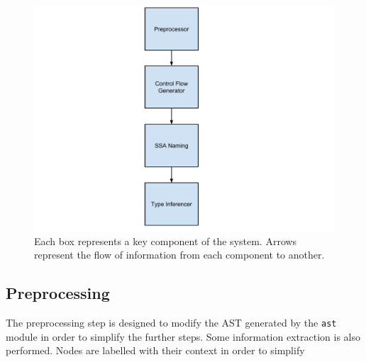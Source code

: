 \documentclass[12pt, titlepage]{article}
\begin{document}
\begin{figure}
\centering
\includegraphics[scale=0.5]{images/systemStructure.pdf}
\caption{Each box represents a key component of the system. Arrows represent the flow of information from each component to another.}
\label{fig:systemStructure}
\end{figure}

\subsection{Preprocessing}
The preprocessing step is designed to modify the AST generated by the \texttt{ast} module in order to simplify the further steps. Some information extraction is also performed. Nodes are labelled with their context in order to simplify
\end{document}
